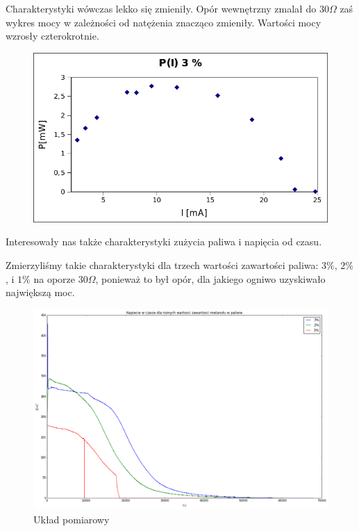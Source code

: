 \documentclass[a4paper,12pt]{article}
\begin{document}
Charakterystyki wówczas lekko się zmieniły. Opór wewnętrzny zmalał do $30 \Omega $ zaś wykres mocy w zależności od natężenia znacząco zmieniły. Wartości mocy wzrosły czterokrotnie. 
\begin{figure} [H]
 \begin{center}
    \includegraphics[width = 15cm]{po.png}
  \end{center}
\end{figure}

Interesowały nas także charakterystyki zużycia paliwa i napięcia od czasu.

Zmierzyliśmy takie charakterystyki dla trzech wartości zawartości paliwa: $3\%$, $2\%$, i $1\%$ na oporze $30 \Omega $, ponieważ to był opór, dla jakiego ogniwo uzyskiwało największą moc. 

\begin{figure} [H]
 \begin{center}
    \includegraphics[width = 15cm]{DMFC_U(T).png}
    \caption{Układ pomiarowy}
  \end{center}
\end{figure}
\end{document}
